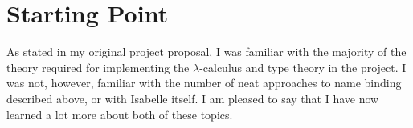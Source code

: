 \section{Starting Point}
As stated in my original project proposal, I was familiar with the majority of the theory required for implementing the \(\lambda\)-calculus and type theory in the project.
I was not, however, familiar with the number of neat approaches to name binding described above, or with Isabelle itself.
I am pleased to say that I have now learned a lot more about both of these topics.
